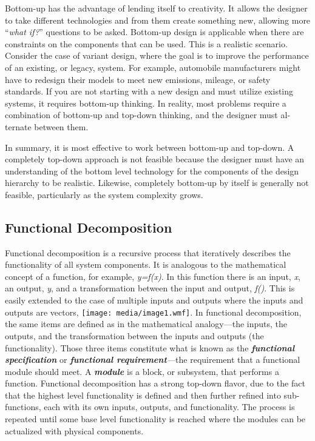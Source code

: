 Bottom-up has the advantage of lending itself to creativity. It allows
the designer to take different technologies and from them create
something new, allowing more ``\emph{what if?}'' questions to be asked.
Bottom-up design is applicable when there are constraints on the
components that can be used. This is a realistic scenario. Consider the
case of variant design, where the goal is to improve the performance of
an existing, or legacy, system. For example, automobile manufacturers
might have to redesign their models to meet new emissions, mileage, or
safety standards. If you are not starting with a new design and must
utilize existing systems, it requires bottom-up thinking. In reality,
most problems require a combination of bottom-up and top-down thinking,
and the designer must al­ternate between them.

In summary, it is most effective to work between bottom-up and top-down.
A completely top-down approach is not feasible because the designer must
have an understanding of the bottom level technology for the components
of the design hierarchy to be realistic. Likewise, com­pletely bottom-up
by itself is generally not feasible, particularly as the system
complexity grows.

\subsection{Functional Decomposition}\label{functional-decomposition}

Functional decomposition is a recursive process that iteratively
describes the functionality of all system components. It is analogous to
the mathematical concept of a function, for example, \emph{y=f(x)}. In
this function there is an input, \emph{x}, an output, \emph{y}, and a
transformation between the input and output, \emph{f()}. This is easily
extended to the case of multiple inputs and outputs where the inputs and
outputs are vectors, \texttt{[image: media/image1.wmf]}. In functional
decomposition, the same items are defined as in the mathematical
analogy---the inputs, the outputs, and the transformation between the
inputs and outputs (the functionality). Those three items constitute
what is known as the \emph{\textbf{functional specification}} or
\emph{\textbf{functional requirement}­---}the requirement that a
functional module should meet. A \emph{\textbf{module}} is a block, or
subsystem, that performs a function. Functional decomposition has a
strong top-down flavor, due to the fact that the highest level
functionality is defined and then further refined into sub-functions,
each with its own inputs, outputs, and functionality. The process is
repeated until some base level functionality is reached where the
modules can be actualized with physical components.

